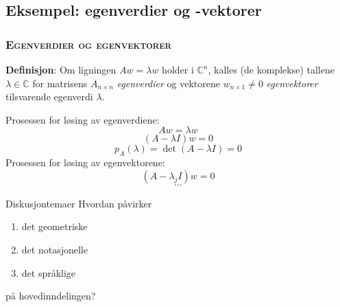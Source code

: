 \documentclass[xcolor=x11names,compress]{beamer}
\renewcommand{\(}{\begin{columns}}
\renewcommand{\)}{\end{columns}}
\newcommand{\<}[1]{\begin{column}{#1}}
\renewcommand{\>}{\end{column}}
\begin{document}
%
\begin{frame}
    \subsection{Eksempel: egenverdier og -vektorer}
      \frametitle{\scshape Egenverdier og egenvektorer}
      {\bf Definisjon}: Om ligningen $A w = \lambda w$ holder i $\mathbb{C}^n$, kalles (de komplekse)
       tallene $\lambda \in \mathbb{C}$
       for   matrisens $A_{\scriptscriptstyle n\times n}$ {\it egenverdier} og  vektorene $w_{\scriptscriptstyle n\times 1} \ne 0$  {\it egenvektorer}
       tilsvarende egenverdi $\lambda$.
\end{frame}
%
%
\begin{frame}
Prosessen for løsing av egenverdiene:
   $$ A w = \lambda w $$ \pause
   $$ (A-\lambda I) w = 0$$ \pause
   $$ p_A(\lambda) = \det(A-\lambda I) = 0 $$ \pause
   Prosessen for løsing av egenvektorene:
     $$ (A - \lambda_j I) w = 0 $$
     $$ \cdots$$
\end{frame}
%
%
\begin{frame}
   
      Diskusjontemaer
      Hvordan påvirker
      \begin{enumerate}
      \item det geometriske
      \item det notasjonelle
       \item det språklige
      \end{enumerate}
      på hovedinndelingen?
\end{frame}
%
\end{document}
